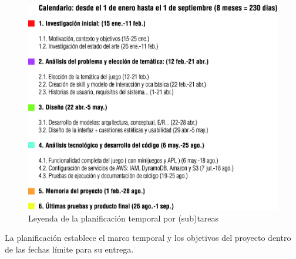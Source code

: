 \begin{figure}[H]
	\centering
	\includegraphics[width=1\textwidth]{imgs/tabla-planning2.jpg}
	\caption{Leyenda de la planificación temporal por (sub)tareas}
	\label{fig:planning2}
\end{figure}

\newpage
La planificación establece el marco temporal y los objetivos del proyecto dentro de las fechas límite para su entrega.


